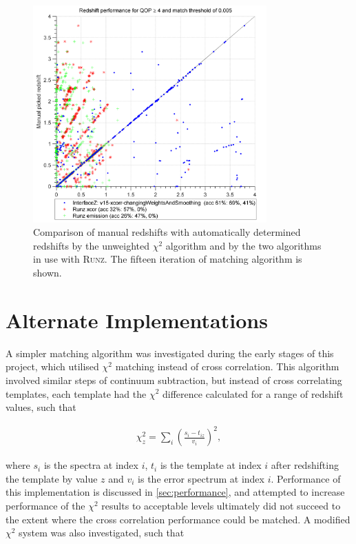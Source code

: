 \documentclass[titlesmallcaps, examinerscopy, copyrightpage]{uqthesis}
\newcommand{\runz}{\textsc{Runz}}
\newcommand{\brac}[1]{\left( #1 \right)}
\begin{document}
\begin{figure}[ht!]
\includegraphics[width=0.8\textwidth]{images/final.png} 
\centering
\caption{Comparison of manual redshifts with automatically determined redshifts by the unweighted $\chi^2$ algorithm and by the two algorithms in use with \runz{}. The fifteen iteration of matching algorithm is shown.}
\label{fig:final}
\end{figure}




\section{Alternate Implementations}

A simpler matching algorithm was investigated during the early stages of this project, which utilised $\chi^2$ matching instead of cross correlation. This algorithm involved similar steps of continuum subtraction, but instead of cross correlating templates, each template had the $\chi^2$ difference calculated for a range of redshift values, such that 

\begin{align}
\chi^2_z = \sum\limits_i \brac{\frac{s_i - t_{iz}}{v_i}}^2,
\end{align}

where $s_i$ is the spectra at index $i$, $t_i$ is the template at index $i$ after redshifting the template by value $z$ and $v_i$ is the error spectrum at index $i$. Performance of this implementation is discussed in \ref{sec:performance}, and attempted to increase performance of the $\chi^2$ results to acceptable levels ultimately did not succeed to the extent where the cross correlation performance could be matched. A modified $\chi^2$ system was also investigated, such that 
\end{document}
